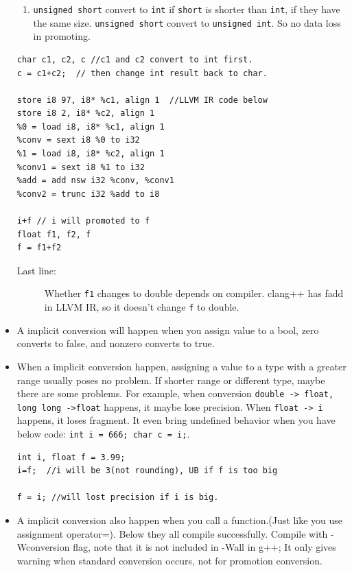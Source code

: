 \documentclass[a4paper,11pt,twoside]{book}
\begin{document}
\begin{itemize}
\begin{enumerate}
		\item \texttt{unsigned short} convert to \texttt{int} if \texttt{short} is shorter than \texttt{int}, if they have the same size. \texttt{unsigned short} convert to \texttt{unsigned int}.  So no data loss in promoting.
	\end{enumerate}
	
\begin{lstlisting}
char c1, c2, c //c1 and c2 convert to int first.
c = c1+c2;  // then change int result back to char.

store i8 97, i8* %c1, align 1  //LLVM IR code below
store i8 2, i8* %c2, align 1
%0 = load i8, i8* %c1, align 1
%conv = sext i8 %0 to i32
%1 = load i8, i8* %c2, align 1
%conv1 = sext i8 %1 to i32
%add = add nsw i32 %conv, %conv1
%conv2 = trunc i32 %add to i8 

i+f // i will promoted to f
float f1, f2, f
f = f1+f2  
\end{lstlisting}
	
	\begin{description}
		\item[Last line:] Whether \texttt{f1} changes to double depends on compiler. clang++ has fadd in LLVM IR, so it doesn't change \texttt{f} to double.
	\end{description}
	
	\item A implicit conversion will happen when you assign value to a bool, zero converts to false, and nonzero converts to true.
	
	\item When a implicit conversion happen, assigning a value to a type with a greater range usually poses no problem. If shorter range or different type, maybe there are some problems. For example, when conversion \texttt{double -> float, long long ->float} happens, it maybe lose precision. When \texttt{float -> i} happens, it loses fragment. It even bring undefined behavior when you have below code: \texttt{int i = 666; char c = i;}.
	
\begin{lstlisting}
int i, float f = 3.99;
i=f;  //i will be 3(not rounding), UB if f is too big

f = i; //will lost precision if i is big.
\end{lstlisting}
	
	\item A implicit conversion also happen when you call a function.(Just like you use assignment operator=). Below they all compile successfully. Compile with -Wconversion flag, note that it is not included in -Wall in g++; It only gives warning when standard conversion occurs, not for promotion conversion.


\end{itemize}
\end{document}
